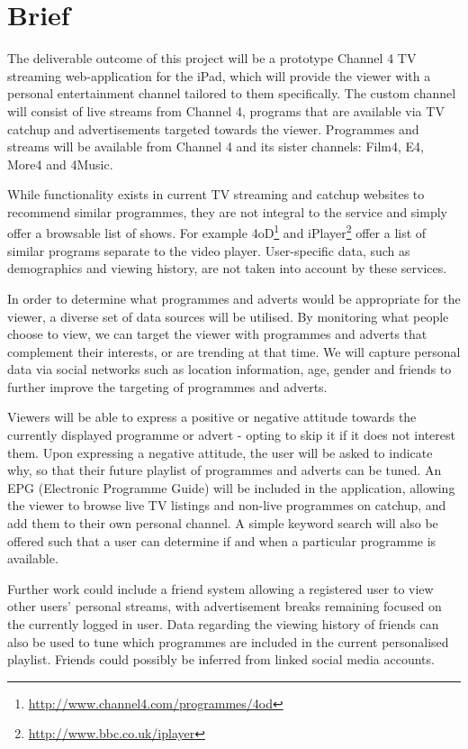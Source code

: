 \section{Brief}
\label{sec:appendix_brief}

The deliverable outcome of this project will be a prototype Channel 4 TV streaming web-application for the iPad, which will provide the viewer with a personal entertainment channel tailored to them specifically. The custom channel will consist of live streams from Channel 4, programs that are available via TV catchup and advertisements targeted towards the viewer. Programmes and streams will be available from Channel 4 and its sister channels: Film4, E4, More4 and 4Music.

While functionality exists in current TV streaming and catchup websites to recommend similar programmes, they are not integral to the service and simply offer a browsable list of shows. For example 4oD\footnote{\url{http://www.channel4.com/programmes/4od}} and iPlayer\footnote{\url{http://www.bbc.co.uk/iplayer}} offer a list of similar programs separate to the video player. User-specific data, such as demographics and viewing history, are not taken into account by these services.

In order to determine what programmes and adverts would be appropriate for the viewer, a diverse set of data sources will be utilised. By monitoring what people choose to view, we can target the viewer with programmes and adverts that complement their interests, or are trending at that time. We will capture personal data via social networks such as location information, age, gender and friends to further improve the targeting of programmes and adverts.

Viewers will be able to express a positive or negative attitude towards the currently displayed programme or advert - opting to skip it if it does not interest them. Upon expressing a negative attitude, the user will be asked to indicate why, so that their future playlist of programmes and adverts can be tuned. An EPG (Electronic Programme Guide) will be included in the application, allowing the viewer to browse live TV listings and non-live programmes on catchup, and add them to their own personal channel. A simple keyword search will also be offered such that a user can determine if and when a particular programme is available. 

Further work could include a friend system allowing a registered user to view other users' personal streams, with advertisement breaks remaining focused on the currently logged in user. Data regarding the viewing history of friends can also be used to tune which programmes are included in the current personalised playlist. Friends could possibly be inferred from linked social media accounts.


